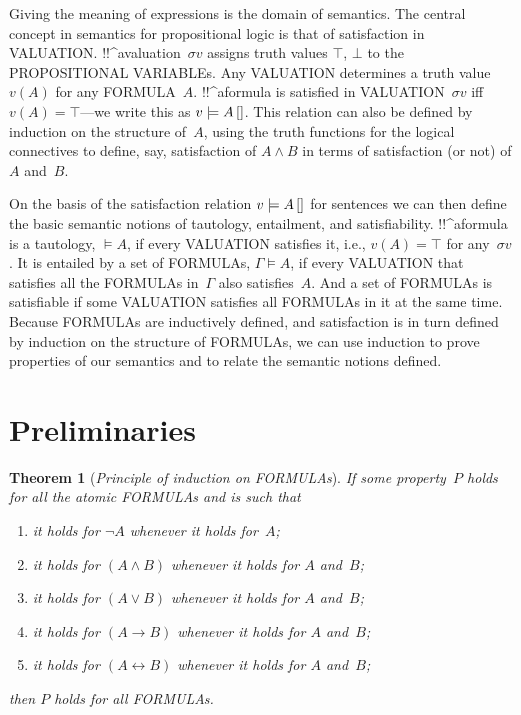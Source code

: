 \documentclass[10pt,a4paper]{article}
\newcommand*{\olup}[1]{\MakeUppercase{#1}}
\theoremstyle{plain}
\newtheorem{thm}{Theorem}[section]
\theoremstyle{definition}
\theoremstyle{remark}
\newcommand*{\olfileid}[3]{}
\newcommand*{\olsection}[1]{\section*{#1}}
\newcommand*{\ollabel}[1]{\label{#1}}
\providecommand{\lif}{\mathbin{\rightarrow}}
\providecommand{\Entails}{\mathrel{\models}}
\providecommand{\True}{\top}
\providecommand{\False}{\bot}
\providecommand{\tagitem}[1]{\item[#1]}
\providecommand{\pValue}[1]{#1}
\providecommand{\pSat}[3]{#1 \models #2\,[#3]}
\providecommand{\pAssign}{\sigma}
\providecommand{\liff}{\mathbin{\leftrightarrow}}
\begin{document}
Giving the meaning of expressions is the domain of semantics.  The
central concept in semantics for propositional logic is that of
satisfaction in \olup{valuation}. !!^a{valuation}~$\pAssign{v}$ assigns
truth values $\True$, $\False$ to the \olup{propositional variable}s. Any
\olup{valuation} determines a truth value $\pValue{v}(A)$ for any
\olup{formula}~$A$.  !!^a{formula} is satisfied in
\olup{valuation}~$\pAssign{v}$ iff $\pValue{v}(A) = \True$---we write
this as $\pSat{v}{A}$. This relation can also be defined by induction on
the structure of~$A$, using the truth functions for the logical
connectives to define, say, satisfaction of $A \land B$ in terms of
satisfaction (or not) of $A$ and~$B$.

On the basis of the satisfaction relation $\pSat{v}{A}$ for sentences
we can then define the basic semantic notions of tautology,
entailment, and satisfiability.  !!^a{formula} is a tautology,
$\Entails A$, if every \olup{valuation} satisfies it, i.e.,
$\pValue{v}(A) = \True$ for any~$\pAssign{v}$. It is entailed by a
set of \olup{formula}s, $\Gamma \Entails A$, if every \olup{valuation} that
satisfies all the \olup{formula}s in~$\Gamma$ also satisfies~$A$. And a
set of \olup{formula}s is satisfiable if some \olup{valuation} satisfies all
\olup{formula}s in it at the same time.  Because \olup{formula}s are
inductively defined, and satisfaction is in turn defined by induction
on the structure of \olup{formula}s, we can use induction to prove
properties of our semantics and to relate the semantic notions
defined.






\olfileid{pl}{syn}{pre}

\olsection{Preliminaries}

\begin{thm}[\emph{Principle of induction on \olup{formula}s}]
  \ollabel{thm:induction}  
  If some property~$P$ holds for all the atomic \olup{formula}s and is
  such that
  \begin{enumerate}
    \tagitem{prvNot}{it holds for $\lnot A$ whenever it holds
      for~$A$;}{}
    \tagitem{prvAnd}{it holds for $(A \land B)$
      whenever it holds for $A$ and~$B$;}{}
    \tagitem{prvOr}{it holds for $(A \lor B)$
      whenever it holds for $A$ and~$B$;}{}
    \tagitem{prvIf}{it holds for $(A \lif B)$
      whenever it holds for $A$ and~$B$;}{}
    \tagitem{prvIff}{it holds for $(A \liff B)$
      whenever it holds for $A$ and~$B$;}{}
  \end{enumerate}
  then $P$ holds for all \olup{formula}s.
\end{thm}
\end{document}
